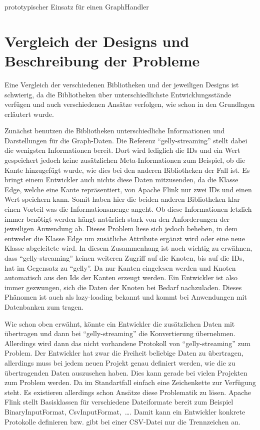 \begin{listing}
\inputminted[breaklines=true]{java}{../material/code/GephiGraphHandler.java}
\caption{prototypischer Einsatz für einen GraphHandler}
\label{code:GephiGraphHandler}
\end{listing}

\section{Vergleich der Designs und Beschreibung der Probleme}
Eine Vergleich der verschiedenen Bibliotheken und der jeweiligen Designs ist
schwierig, da die Bibliotheken über unterschiedlichste Entwicklungsstände
verfügen und auch verschiedenen Ansätze verfolgen, wie schon in den Grundlagen
erläutert wurde.

Zunächst benutzen die Bibliotheken unterschiedliche Informationen und Darstellungen
für die Graph-Daten. Die Referenz \enquote{gelly-streaming} stellt dabei die
wenigsten Informationen bereit. Dort wird lediglich die IDs und ein Wert
gespeichert jedoch keine zusätzlichen Meta-Informationen zum Beispiel, ob die
Kante hinzugefügt wurde, wie dies bei den anderen Bibliotheken der Fall ist.
Es bringt einem Entwickler auch nichts diese Daten mitzusenden, da die
Klasse Edge, welche eine Kante repräsentiert, von Apache Flink nur zwei IDs und
einen Wert speichern kann. Somit haben hier die beiden anderen Bibliotheken klar
einen Vorteil was die Informationsmenge angeht. Ob diese Informationen letzlich
immer benötigt werden hängt natürlich stark von den Anforderungen der jeweiligen
Anwendung ab. Dieses Problem liese sich jedoch beheben, in dem entweder die Klasse
Edge um zusätliche Attribute ergänzt wird oder eine neue Klasse abgeleitete wird.
In diesem Zusammenhang ist noch wichtig zu erwähnen, dass \enquote{gelly-streaming}
keinen weiteren Zugriff auf die Knoten, bis auf die IDs, hat im Gegensatz zu \enquote{gelly}.
Da nur Kanten eingelesen werden und Knoten automatisch aus den Ids der Kanten
erzeugt werden. Ein Entwickler ist also immer gezwungen, sich die Daten der
Knoten bei Bedarf nachzuladen. Dieses Phänomen ist auch als lazy-loading bekannt
und kommt bei Anwendungen mit Datenbanken zum tragen.

Wie schon oben erwähnt, könnte ein Entwickler die zusätzlichen Daten mit
übertragen und dann bei \enquote{gelly-streaming} die Konvertierung übernehmen.
Allerdings wird dann das nicht vorhandene Protokoll von \enquote{gelly-streaming}
zum Problem. Der Entwickler hat zwar die Freiheit beliebige Daten zu übertragen,
allerdings muss bei jedem neuen Projekt genau definiert werden, wie die zu
übertragenden Daten auszusehen haben. Dies kann gerade bei vielen Projekten zum
Problem werden. Da im Standartfall einfach eine Zeichenkette zur Verfügung steht.
Es existieren allerdings schon Ansätze diese Problematik zu lösen. Apache Flink
stellt Basisklassen für verschiedene Dateiformate bereit zum Beispiel
BinaryInputFormat, CsvInputFormat,~\dots . Damit kann ein Entwickler konkrete
Protokolle definieren bzw. gibt bei einer CSV-Datei nur die Trennzeichen an.

